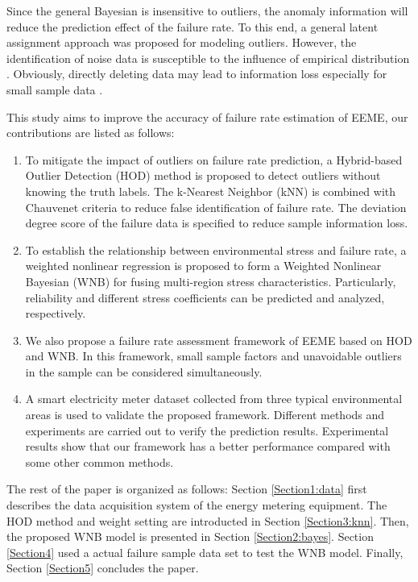 \documentclass[journal,twoside,web]{ieeecolor}
\begin{document}
Since the general Bayesian is insensitive to outliers, the anomaly information will reduce the prediction effect of the failure rate.
To this end, a general latent assignment approach was proposed for modeling outliers. However, the identification of noise data is susceptible to the influence of empirical distribution \cite{ZEIGENFUSE2010352}.  Obviously, directly deleting data  may lead to information loss especially for small sample data \cite{MOGHADDASS2019561}.

This study aims to improve the accuracy of failure rate estimation of EEME, our contributions are listed as follows:

\begin{enumerate}
	\item To mitigate the impact of outliers on failure rate prediction, a Hybrid-based Outlier Detection (HOD) method is proposed to detect outliers without knowing the truth labels. The k-Nearest Neighbor (kNN) is combined with Chauvenet criteria to reduce false identification of failure rate. The deviation degree score of the failure data is specified to reduce sample information loss.

	\item To establish the relationship between environmental stress and failure rate, a weighted nonlinear regression is proposed to form a Weighted Nonlinear Bayesian (WNB) for fusing multi-region stress characteristics. Particularly, reliability and different stress coefficients  can be predicted and analyzed, respectively.
	
	\item We also propose a failure rate assessment framework of EEME based on HOD and WNB. In this framework, small sample factors and unavoidable outliers in the sample can be considered simultaneously.
	
	\item A smart electricity meter dataset collected from three typical environmental areas is used to validate the proposed framework.
	Different methods and experiments are carried out to verify the prediction results. Experimental results show that our framework has a better performance compared with some other common methods.

\end{enumerate}





The rest of the paper is organized as follows: Section \ref{Section1:data} first describes the data acquisition system of the energy metering equipment. The HOD method and weight setting are introducted in Section \ref{Section3:knn}. Then, the proposed WNB model is presented in Section \ref{Section2:bayes}. Section \ref{Section4} used a actual failure sample data set to test the WNB model. Finally, Section \ref{Section5} concludes the paper. 
\end{document}
